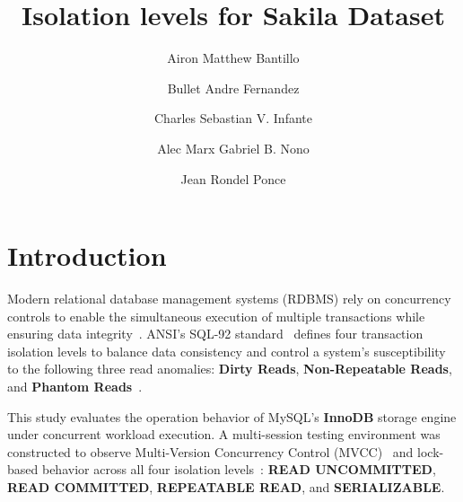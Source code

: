 \documentclass[sigconf, pbalance, nonacm]{acmart}
\begin{document}
\title{Isolation levels for Sakila Dataset}

\author{Airon Matthew Bantillo}

\author{Bullet Andre Fernandez}

\author{Charles Sebastian V. Infante}

\author{Alec Marx Gabriel B. Nono}

\author{Jean Rondel Ponce}

\renewcommand{\shortauthors}{Fernandez et al.}

\maketitle
\section{Introduction}

Modern relational database management systems (RDBMS) rely on concurrency controls to enable the simultaneous execution of multiple transactions while ensuring data integrity~\cite{Silberschatz2020}. ANSI's SQL-92 standard~\cite{ANSI1992} defines four transaction isolation levels to balance data consistency and control a system's susceptibility to the following three read anomalies: \textbf{Dirty Reads}, \textbf{Non-Repeatable Reads}, and \textbf{Phantom Reads}~\cite{Berenson1995}. 

This study evaluates the operation behavior of MySQL's \textbf{InnoDB} storage engine under concurrent workload execution. A multi-session testing environment was constructed to observe Multi-Version Concurrency Control (MVCC)~\cite{MySQLConsistentRead} and lock-based behavior across all four isolation levels~\cite{MySQLIsolation}: \textbf{READ UNCOMMITTED}, \textbf{READ COMMITTED}, \textbf{REPEATABLE READ}, and \textbf{SERIALIZABLE}. 
\end{document}

